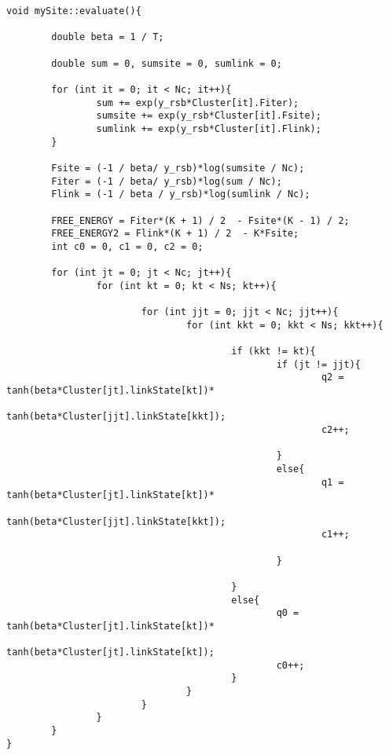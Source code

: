 \begin{verbatim}
void mySite::evaluate(){

        double beta = 1 / T;

        double sum = 0, sumsite = 0, sumlink = 0;

        for (int it = 0; it < Nc; it++){
                sum += exp(y_rsb*Cluster[it].Fiter);
                sumsite += exp(y_rsb*Cluster[it].Fsite);
                sumlink += exp(y_rsb*Cluster[it].Flink);
        }

        Fsite = (-1 / beta/ y_rsb)*log(sumsite / Nc);
        Fiter = (-1 / beta/ y_rsb)*log(sum / Nc);
        Flink = (-1 / beta / y_rsb)*log(sumlink / Nc);

        FREE_ENERGY = Fiter*(K + 1) / 2  - Fsite*(K - 1) / 2;
        FREE_ENERGY2 = Flink*(K + 1) / 2  - K*Fsite;
        int c0 = 0, c1 = 0, c2 = 0;

        for (int jt = 0; jt < Nc; jt++){
                for (int kt = 0; kt < Ns; kt++){

                        for (int jjt = 0; jjt < Nc; jjt++){
                                for (int kkt = 0; kkt < Ns; kkt++){

                                        if (kkt != kt){
                                                if (jt != jjt){
                                                        q2 = tanh(beta*Cluster[jt].linkState[kt])*
                                                                tanh(beta*Cluster[jjt].linkState[kkt]);
                                                        c2++;

                                                }
                                                else{
                                                        q1 = tanh(beta*Cluster[jt].linkState[kt])*
                                                                tanh(beta*Cluster[jjt].linkState[kkt]);
                                                        c1++;

                                                }

                                        }
                                        else{
                                                q0 = tanh(beta*Cluster[jt].linkState[kt])*
                                                        tanh(beta*Cluster[jt].linkState[kt]);
                                                c0++;
                                        }
                                }
                        }
                }
        }
}
\end{verbatim}

